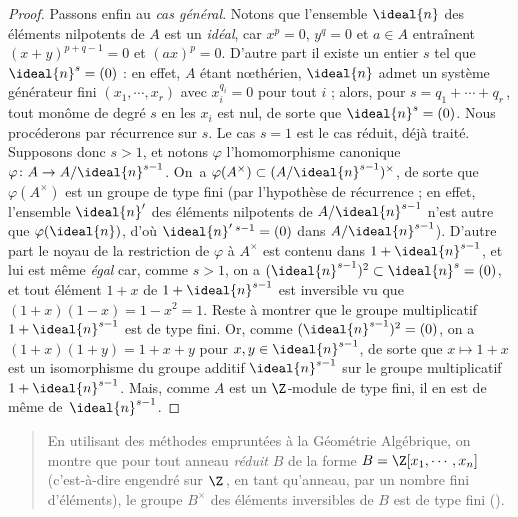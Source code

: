 \documentclass[11pt, useosf,
  title in boldface,
  theorem in new line,
  theorem numbering = section,
  number theorems separately,
]{simplivre}
\begin{document}
\begin{proof}
        Passons enfin au \emph{cas général}. Notons que l'ensemble \( \ideal{n} \) des éléments nilpotents de \( A \) est un \emph{idéal}, car \( x^p = 0 \), \( y^q = 0 \) et \( a \in A \) entraînent \( (x+y)^{p+q-1} = 0 \) et \( (ax)^p = 0 \). D'autre part il existe un entier \( s \) tel que \( \ideal{n}^s = (0) \) : en effet, \( A \) étant nœthérien, \( \ideal{n} \) admet un système générateur fini \( (x_1, \cdots, x_r) \) avec \( x_i^{q_i} = 0 \) pour tout \( i \) ; alors, pour \( s = q_1 + \cdots + q_r \)\,, tout monôme de degré \( s \) en les \( x_i \) est nul, de sorte que \( \ideal{n}^s = (0) \). Nous procéderons par récurrence sur \( s \). Le cas \( s = 1 \) est le cas réduit, déjà traité. Supposons donc \( s > 1 \), et notons \( \varphi \) l'homomorphisme canonique \( \varphi \colon A \to A/\ideal{n}^{s-1} \). On~a \( \varphi(A^\times) \subset (A/\ideal{n}^{s-1})^\times \), de sorte que \( \varphi(A^\times) \) est un groupe de type fini (par l'hypothèse de récurrence ; en effet, l'ensemble \( \ideal{n}' \) des éléments nilpotents de \( A/\ideal{n}^{s-1} \) n'est autre que \( \varphi(\ideal{n}) \), d'où \( \ideal{n}'\,{}^{s-1} = (0) \) dans \( A/\ideal{n}^{s-1} \)). D'autre part le noyau de la restriction de \( \varphi \) à \( A^\times \) est contenu dans \( 1+\ideal{n}^{s-1} \), et lui est même \emph{égal} car, comme \( s > 1 \), on a \( (\ideal{n}^{s-1})^2 \subset \ideal{n}^s = (0) \), et tout élément \( 1+x \) de \( 1+\ideal{n}^{s-1} \) est inversible vu que \( (1+x)(1-x) = 1-x^2 = 1 \). Reste à montrer que le groupe multiplicatif \( 1+\ideal{n}^{s-1} \) est de type fini. Or, comme \( (\ideal{n}^{s-1})^2 = (0) \), on a \( (1+x)(1+y) = 1+x+y \) pour \( x,y \in \ideal{n}^{s-1} \), de sorte que \( x \mapsto 1+x \) est un isomorphisme du groupe additif \( \ideal{n}^{s-1} \) sur le groupe multiplicatif \( 1+\ideal{n}^{s-1} \). Mais, comme \( A \) est un \( \Z \)‑module de type fini, il en est de même de~\( \ideal{n}^{s-1} \).
    \end{proof}

    \begin{quote}
        En utilisant des méthodes empruntées à la Géométrie Algébrique, on montre que pour tout anneau \emph{réduit} \( B \) de la forme \( B = \Z[x_1, \cdots, x_n] \) (c'est-à-dire engendré sur \( \Z \)\,, en tant qu'anneau, par un nombre fini d'éléments), le groupe \( B^\times \) des éléments inversibles de \( B \) est de type fini (\cite{samuel1966}).
    \end{quote}

\cleardoublepage
{}
{}
\end{document}
